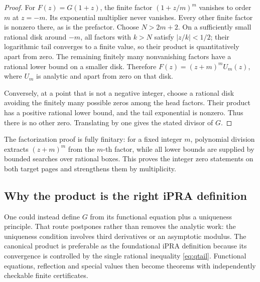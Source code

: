 \begin{proof}
For \(F(z)=G(1+z)\), the finite factor
\((1+z/m)^m\) vanishes to order \(m\) at \(z=-m\).  Its exponential multiplier
never vanishes.  Every other finite factor is nonzero there, as is the
prefactor.  Choose \(N>2m+2\).  On a sufficiently small rational disk around
\(-m\), all factors with \(k>N\) satisfy \(|z/k|<1/2\); their logarithmic tail
converges to a finite value, so their product is quantitatively apart from zero.
The remaining finitely many nonvanishing factors have a rational lower bound on
a smaller disk.  Therefore \(F(z)=(z+m)^m U_m(z)\), where \(U_m\) is analytic
and apart from zero on that disk.

Conversely, at a point that is not a negative integer, choose a rational disk
avoiding the finitely many possible zeros among the head factors.  Their product
has a positive rational lower bound, and the tail exponential is nonzero.  Thus
there is no other zero.  Translating by one gives the stated divisor of \(G\).
\end{proof}

The factorization proof is fully finitary: for a fixed integer \(m\), polynomial
division extracts \((z+m)^m\) from the \(m\)-th factor, while all lower bounds
are supplied by bounded searches over rational boxes.  This proves the integer
zero statements on both target pages and strengthens them by multiplicity.

\subsection{Why the product is the right iPRA definition}

One could instead define \(G\) from its functional equation plus a uniqueness
principle.  That route postpones rather than removes the analytic work: the
uniqueness condition involves third derivatives or an asymptotic modulus.  The
canonical product is preferable as the foundational iPRA definition because
its convergence is controlled by the single rational inequality
\cref{eq:qtail}.  Functional equations, reflection and special values then
become theorems with independently checkable finite certificates.
